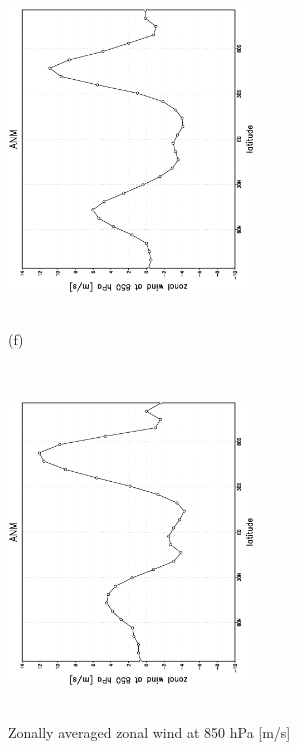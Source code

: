 \documentclass[12pt,a4paper,twoside,openright,headinclude,liststotoc,bibtotoc]{scrreprt}
\begin{document}
\begin{appendix}
\begin{figure}[b]
{\includegraphics[height=8.5cm,width=6.5cm,angle=-90]
{eps/zontmu_850.eps}
}
\parbox{8.5cm}{\hspace{0.80cm} \begin{scriptsize}(f) \end{scriptsize} \vspace{-0.5cm} \\
\includegraphics[height=8.5cm,width=6.5cm,angle=-90]
{eps/t21zontmuvel131850.eps}
}
\caption[Zonally averaged zonal wind at 850 hPa]{Zonally averaged zonal wind at 850 hPa [m/s]}
\label{img:uzon850}
\end{figure}

\newpage


\end{appendix}
\end{document}
